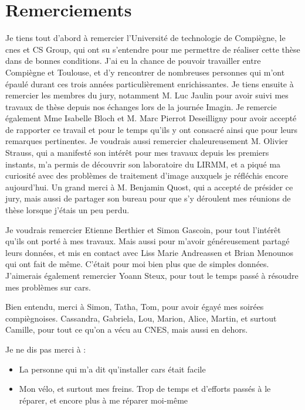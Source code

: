 \chapter*{Remerciements}
Je tiens tout d'abord à remercier l'Université de technologie de Compiègne, le \acrshort{cnes} et CS Group, qui ont su s'entendre pour me permettre de réaliser cette thèse dans de bonnes conditions. J'ai eu la chance de pouvoir travailler entre Compiègne et Toulouse, et d'y rencontrer de nombreuses personnes qui m'ont épaulé durant ces trois années particulièrement enrichissantes. Je tiens ensuite à remercier les membres du jury, notamment M. Luc Jaulin pour avoir suivi mes travaux de thèse depuis nos échanges lors de la journée Imagin. Je remercie également Mme Isabelle Bloch et M. Marc Pierrot Deseilligny pour avoir accepté de rapporter ce travail et pour le temps qu’ils y ont consacré ainsi que pour leurs remarques pertinentes. Je voudrais aussi remercier chaleureusement M. Olivier Strauss, qui a manifesté son intérêt pour mes travaux depuis les premiers instants, m'a permis de découvrir son laboratoire du LIRMM, et a piqué ma curiosité avec des problèmes de traitement d'image auxquels je réfléchis encore aujourd'hui. Un grand merci à M. Benjamin Quost, qui a accepté de présider ce jury, mais aussi de partager son bureau pour que s'y déroulent mes réunions de thèse lorsque j'étais un peu perdu.

Je voudrais remercier Etienne Berthier et Simon Gascoin, pour tout l'intérêt qu'ils ont porté à mes travaux. Mais aussi pour m'avoir généreusement partagé leurs données, et mis en contact avec Liss Marie Andreassen et Brian Menounos qui ont fait de même. C'était pour moi bien plus que de simples données. J'aimerais également remercier Yoann Steux, pour tout le temps passé à résoudre mes problèmes sur \acrshort{cars}.

Bien entendu, merci à Simon, Tatha, Tom, pour avoir égayé mes soirées compiègnoises. Cassandra, Gabriela, Lou, Marion, Alice, Martin, et surtout Camille, pour tout ce qu'on a vécu au CNES, mais aussi en dehors.

Je ne dis pas merci à :
\begin{itemize}
    \item La personne qui m’a dit qu’installer \acrshort{cars} était facile
    \item Mon vélo, et surtout mes freins. Trop de temps et d’efforts passés à le réparer, et encore plus à me réparer moi-même
\end{itemize}

